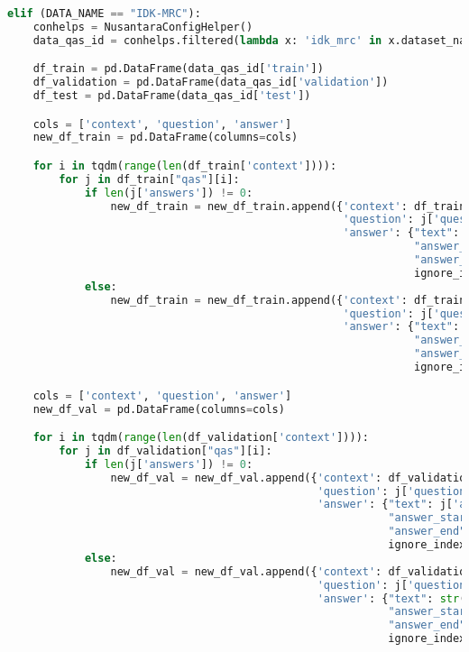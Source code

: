 \begin{lstlisting}[language=Python, caption=Mengimpor \emph{dataset} sistem tanya jawab]
elif (DATA_NAME == "IDK-MRC"):
    conhelps = NusantaraConfigHelper()
    data_qas_id = conhelps.filtered(lambda x: 'idk_mrc' in x.dataset_name)[0].load_dataset()

    df_train = pd.DataFrame(data_qas_id['train'])
    df_validation = pd.DataFrame(data_qas_id['validation'])
    df_test = pd.DataFrame(data_qas_id['test'])

    cols = ['context', 'question', 'answer']
    new_df_train = pd.DataFrame(columns=cols)

    for i in tqdm(range(len(df_train['context']))):
        for j in df_train["qas"][i]:
            if len(j['answers']) != 0:
                new_df_train = new_df_train.append({'context': df_train["context"][i], 
                                                    'question': j['question'], 
                                                    'answer': {"text": j['answers'][0]['text'], 
                                                               "answer_start": j['answers'][0]['answer_start'], 
                                                               "answer_end": j['answers'][0]['answer_start'] + len(j['answers'][0]['text'])}}, 
                                                               ignore_index=True)
            else:
                new_df_train = new_df_train.append({'context': df_train["context"][i], 
                                                    'question': j['question'], 
                                                    'answer': {"text": str(), 
                                                               "answer_start": 0, 
                                                               "answer_end": 0}}, 
                                                               ignore_index=True)

    cols = ['context', 'question', 'answer']
    new_df_val = pd.DataFrame(columns=cols)

    for i in tqdm(range(len(df_validation['context']))):
        for j in df_validation["qas"][i]:
            if len(j['answers']) != 0:
                new_df_val = new_df_val.append({'context': df_validation["context"][i], 
                                                'question': j['question'], 
                                                'answer': {"text": j['answers'][0]['text'], 
                                                           "answer_start": j['answers'][0]['answer_start'], 
                                                           "answer_end": j['answers'][0]['answer_start'] + len(j['answers'][0]['text'])}}, 
                                                           ignore_index=True)
            else:
                new_df_val = new_df_val.append({'context': df_validation["context"][i], 
                                                'question': j['question'], 
                                                'answer': {"text": str(), 
                                                           "answer_start": 0, 
                                                           "answer_end": 0}}, 
                                                           ignore_index=True)        


\end{lstlisting}
